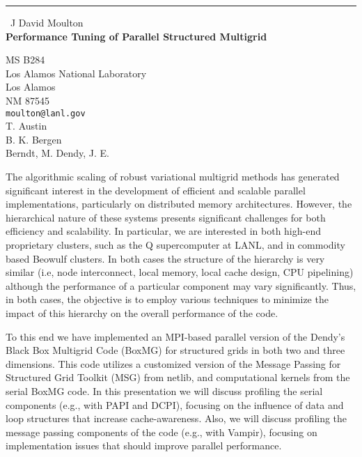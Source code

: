 \documentclass{report}
\begin{document}
\begin{center}
\rule{6in}{1pt} \
{\large J David Moulton \\
{\bf Performance Tuning of Parallel Structured Multigrid}}

MS B284 \\ Los Alamos National Laboratory \\ Los Alamos \\ NM 87545
\\
{\tt moulton@lanl.gov}\\
T. Austin\\
B. K. Bergen\\
	Berndt, M. 
	Dendy, J. E.\end{center}

The algorithmic scaling of robust variational multigrid methods has
generated significant interest in the development of efficient and
scalable parallel implementations, particularly on distributed memory
architectures. However, the hierarchical nature of these systems presents
significant challenges for both efficiency and scalability. In
particular, we are interested in both high-end proprietary clusters, such
as the Q supercomputer at LANL, and in commodity based Beowulf clusters.
In both cases the structure of the hierarchy is very similar (i.e, node
interconnect, local memory, local cache design, CPU pipelining) although
the performance of a particular component may vary significantly. Thus,
in both cases, the objective is to employ various techniques to minimize
the impact of this hierarchy on the overall performance of the code.

To this end we have implemented an MPI-based parallel version of the
Dendy's Black Box Multigrid Code (BoxMG) for structured grids in both two
and three dimensions. This code utilizes a customized version of the
Message Passing for Structured Grid Toolkit (MSG) from netlib, and
computational kernels from the serial BoxMG code. In this presentation we
will discuss profiling the serial components (e.g., with PAPI and DCPI),
focusing on the influence of data and loop structures that increase
cache-awareness. Also, we will discuss profiling the message passing
components of the code (e.g., with Vampir), focusing on implementation
issues that should improve parallel performance.
\end{document}
